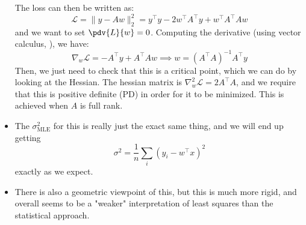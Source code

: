 \begin{itemize}
		The loss can then be written as:
		\[
			\mathcal{L} = \|y - Aw\|_2^2 = y^{\top} y - 2w^{\top} A^{\top} y +
			w^{\top} A^{\top} Aw
		\] 
		and we want to set \( \pdv{L}{w} = 0 \). Computing the derivative (using
		vector calculus, ), we have:
		\[
			\nabla_w \mathcal{L} = -A^{\top} y + A^{\top} A w \implies w = (A^{\top}
			A)^{-1}A^{\top} y
		\]
		Then, we just need to check that this is a critical point, which we can do by
		looking at the Hessian. The hessian matrix is \( \nabla_w^2 \mathcal{L} =
		2A^{\top} A \), and we require that this is positive definite (PD) in order
		for it to be minimized. This is achieved when \( A \) is full rank.   
	\item The \( \sigma^2_\text{MLE} \) for this is really just the exact same thing,
		and we will end up getting 
		\[
			\sigma^2 = \frac{1}{n}\sum_i(y_i - w^{\top} x)^2
		\]
		exactly as we expect. 
	\item There is also a geometric viewpoint of this, but this is much more rigid,
		and overall seems to be a "weaker" interpretation of least squares than the
		statistical approach. 
\end{itemize}
